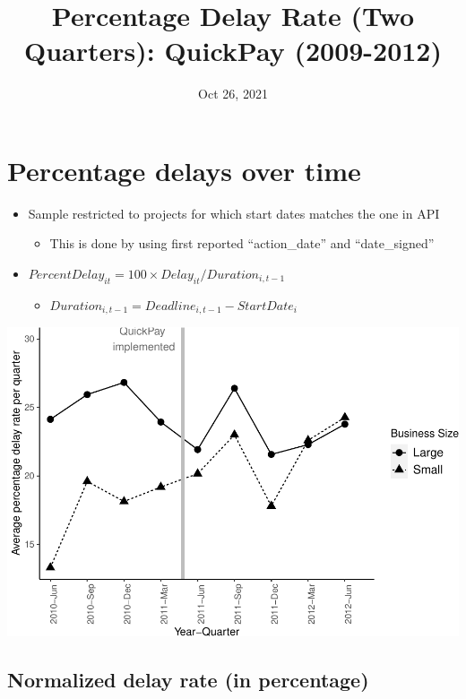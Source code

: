 \documentclass[
]{article}
\title{Percentage Delay Rate (Two Quarters): QuickPay (2009-2012)}
\author{}
\date{\vspace{-2.5em}Oct 26, 2021}
\providecommand{\tightlist}{%
  \setlength{\itemsep}{0pt}\setlength{\parskip}{0pt}}
\begin{document}
\maketitle

\hypertarget{percentage-delays-over-time}{%
\section{Percentage delays over
time}\label{percentage-delays-over-time}}

\begin{itemize}
\tightlist
\item
  Sample restricted to projects for which start dates matches the one in
  API

  \begin{itemize}
  \tightlist
  \item
    This is done by using first reported ``action\_date'' and
    ``date\_signed''
  \end{itemize}
\item
  \(PercentDelay_{it}=100 \times Delay_{it}/Duration_{i,t-1}\)

  \begin{itemize}
  \tightlist
  \item
    \(Duration_{i,t-1} = Deadline_{i,t-1} - StartDate_i\)
  \end{itemize}
\end{itemize}

\includegraphics{qp_first_pc_delay_two_quarters_files/figure-latex/plot_pc_delay-1.pdf}

\hypertarget{normalized-delay-rate-in-percentage}{%
\subsection{Normalized delay rate (in
percentage)}\label{normalized-delay-rate-in-percentage}}
\end{document}
